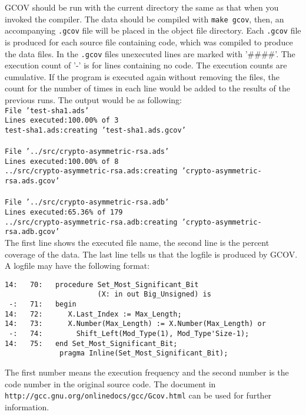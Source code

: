 GCOV should be run with the current directory the same as that when you invoked the compiler. The data should be compiled with \lstinline[style=BashInputStyle]´make gcov´,
then, an accompanying \texttt{.gcov} file will be placed in the object file directory.  
Each \texttt{.gcov} file is produced for each source file containing code, which was compiled to produce the data files. In the \texttt{.gcov} files unexecuted lines are marked with '$\#\#\#\#$'. The execution count of '-' is for lines containing no code. The execution counts are cumulative. If the program is executed again without removing the files, the count for the number of times in each line would be added to the results of the previous runs. 
The output would be as following:\\
\hspace*{1cm}\texttt{File 'test-sha1.ads'}\\
\hspace*{1cm}\texttt{Lines executed:100.00\% of 3}\\
\hspace*{1cm}\texttt{test-sha1.ads:creating 'test-sha1.ads.gcov'}\\
\\
\hspace*{1cm}\texttt{File '../src/crypto-asymmetric-rsa.ads'}\\
\hspace*{1cm}\texttt{Lines executed:100.00\% of 8}\\
\hspace*{1cm}\texttt{../src/crypto-asymmetric-rsa.ads:creating 'crypto-asymmetric-rsa.ad\-s.gcov'}\\
\\
\hspace*{1cm}\texttt{File '../src/crypto-asymmetric-rsa.adb'}\\
\hspace*{1cm}\texttt{Lines executed:65.36\% of 179}\\
\hspace*{1cm}\texttt{../src/crypto-asymmetric-rsa.adb:creating 'crypto-asymmetric-rsa.ad\-b.gcov'}\\

The first line shows the executed file name, the second line is the percent coverage of the data. The last line tells us that the logfile is produced by GCOV. A logfile may have the following format:
\begin{lstlisting} 
14:   70:   procedure Set_Most_Significant_Bit
                      (X: in out Big_Unsigned) is
 -:   71:   begin
14:   72:      X.Last_Index := Max_Length;
14:   73:      X.Number(Max_Length) := X.Number(Max_Length) or
 -:   74:        Shift_Left(Mod_Type(1), Mod_Type'Size-1);
14:   75:   end Set_Most_Significant_Bit; 
	         pragma Inline(Set_Most_Significant_Bit);
\end{lstlisting}
The first number means the execution frequency and the second number is the code number in the original source code. The document in {\tt http://gcc.gnu.org/onlinedocs/gcc/Gc\-ov.html} can be used for further information.
